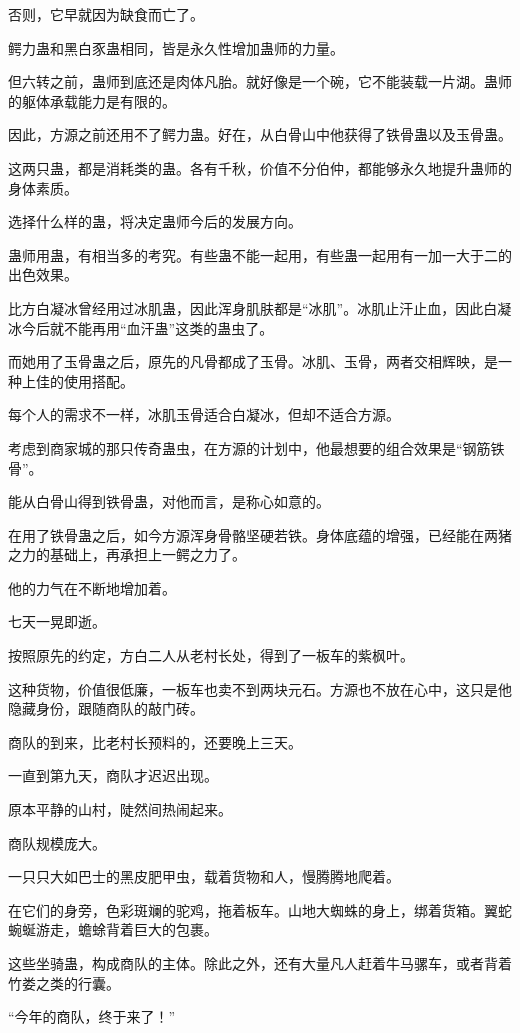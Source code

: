 \begin{this_body}
否则，它早就因为缺食而亡了。

鳄力蛊和黑白豕蛊相同，皆是永久性增加蛊师的力量。

但六转之前，蛊师到底还是肉体凡胎。就好像是一个碗，它不能装载一片湖。蛊师的躯体承载能力是有限的。

因此，方源之前还用不了鳄力蛊。好在，从白骨山中他获得了铁骨蛊以及玉骨蛊。

这两只蛊，都是消耗类的蛊。各有千秋，价值不分伯仲，都能够永久地提升蛊师的身体素质。

选择什么样的蛊，将决定蛊师今后的发展方向。

蛊师用蛊，有相当多的考究。有些蛊不能一起用，有些蛊一起用有一加一大于二的出色效果。

比方白凝冰曾经用过冰肌蛊，因此浑身肌肤都是“冰肌”。冰肌止汗止血，因此白凝冰今后就不能再用“血汗蛊”这类的蛊虫了。

而她用了玉骨蛊之后，原先的凡骨都成了玉骨。冰肌、玉骨，两者交相辉映，是一种上佳的使用搭配。

每个人的需求不一样，冰肌玉骨适合白凝冰，但却不适合方源。

考虑到商家城的那只传奇蛊虫，在方源的计划中，他最想要的组合效果是“钢筋铁骨”。

能从白骨山得到铁骨蛊，对他而言，是称心如意的。

在用了铁骨蛊之后，如今方源浑身骨骼坚硬若铁。身体底蕴的增强，已经能在两猪之力的基础上，再承担上一鳄之力了。

他的力气在不断地增加着。

七天一晃即逝。

按照原先的约定，方白二人从老村长处，得到了一板车的紫枫叶。

这种货物，价值很低廉，一板车也卖不到两块元石。方源也不放在心中，这只是他隐藏身份，跟随商队的敲门砖。

商队的到来，比老村长预料的，还要晚上三天。

一直到第九天，商队才迟迟出现。

原本平静的山村，陡然间热闹起来。

商队规模庞大。

一只只大如巴士的黑皮肥甲虫，载着货物和人，慢腾腾地爬着。

在它们的身旁，色彩斑斓的驼鸡，拖着板车。山地大蜘蛛的身上，绑着货箱。翼蛇蜿蜒游走，蟾蜍背着巨大的包裹。

这些坐骑蛊，构成商队的主体。除此之外，还有大量凡人赶着牛马骡车，或者背着竹娄之类的行囊。

“今年的商队，终于来了！”


\end{this_body}
